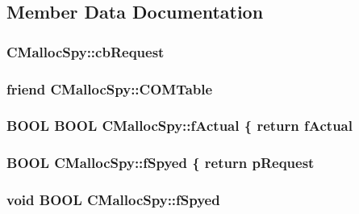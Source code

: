 \subsection{Member Data Documentation}
\hypertarget{class_c_malloc_spy_aaf02555ced89a6f90d0f2ea89408d5bd}{
\subsubsection[{cb\-Request}]{ C\-Malloc\-Spy\-::cb\-Request}}\label{class_c_malloc_spy_aaf02555ced89a6f90d0f2ea89408d5bd}
\hypertarget{class_c_malloc_spy_a7c52b9b5cc4329a16dbfae4ec39ea5a8}{
\subsubsection[{C\-O\-M\-Table}]{\setlength{\rightskip}{0pt plus 5cm}friend C\-Malloc\-Spy\-::\-C\-O\-M\-Table\hspace{0.3cm}{\ttfamily [protected]}}}\label{class_c_malloc_spy_a7c52b9b5cc4329a16dbfae4ec39ea5a8}
\hypertarget{class_c_malloc_spy_a181d2eec704cfcaab9523ff56f6dde09}{
\subsubsection[{f\-Actual}]{\setlength{\rightskip}{0pt plus 5cm}B\-O\-O\-L B\-O\-O\-L C\-Malloc\-Spy\-::f\-Actual \{ return f\-Actual}}\label{class_c_malloc_spy_a181d2eec704cfcaab9523ff56f6dde09}
\hypertarget{class_c_malloc_spy_a6409ca9d853418aaa52df69f44e131d9}{
\subsubsection[{f\-Spyed}]{\setlength{\rightskip}{0pt plus 5cm}B\-O\-O\-L C\-Malloc\-Spy\-::f\-Spyed \{ return p\-Request}}\label{class_c_malloc_spy_a6409ca9d853418aaa52df69f44e131d9}
\hypertarget{class_c_malloc_spy_ab3f126113ce51d6d88c896f937f12210}{
\subsubsection[{f\-Spyed}]{ void B\-O\-O\-L C\-Malloc\-Spy\-::f\-Spyed}}\label{class_c_malloc_spy_ab3f126113ce51d6d88c896f937f12210}
